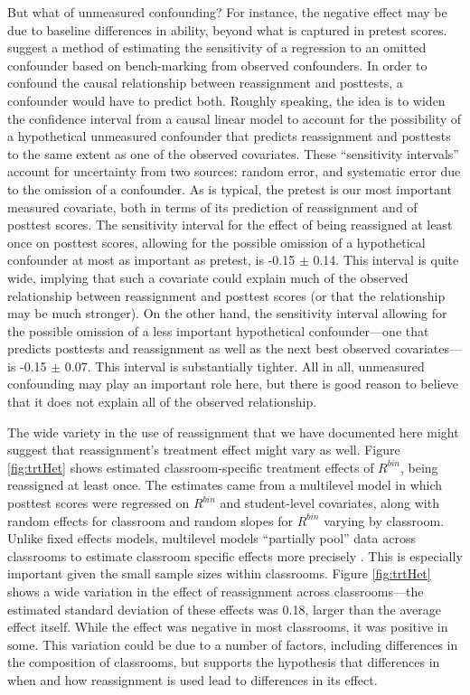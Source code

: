 \documentclass[12pt]{article}\usepackage[]{graphicx}\usepackage[]{color}
\begin{document}
But what of unmeasured confounding?
For instance, the negative effect may be due to baseline differences
in ability, beyond what is captured in pretest scores.
\citet{hhh} suggest a method of estimating the sensitivity of a regression to an omitted confounder based on bench-marking from observed confounders.
In order to confound the causal relationship between reassignment and posttests, a confounder would have to predict both.
Roughly speaking, the idea is to widen the confidence interval from a causal linear model to account for the possibility of a hypothetical unmeasured confounder that predicts reassignment and posttests to the same extent as one of the observed covariates.
These ``sensitivity intervals'' account for uncertainty from two sources: random error, and systematic error due to the omission of a confounder.
As is typical, the pretest is our most important measured covariate, both in terms of its prediction of reassignment and of posttest scores.
The sensitivity interval for the effect of being reassigned at least
once on posttest scores, allowing for the possible omission of a
hypothetical confounder at most as important as pretest, is
-0.15 $\pm$
0.14.
This interval is quite wide, implying that such a covariate could
explain much of the observed relationship between reassignment and
posttest scores (or that the relationship may be much stronger).
On the other hand, the sensitivity interval allowing for the possible
omission of a less important hypothetical confounder---one that
predicts posttests and reassignment as well as the next best observed
covariates---is
-0.15 $\pm$
0.07.
This interval is substantially tighter.
All in all, unmeasured confounding may play an important role here,
but there is good reason to believe that it does not explain all of
the observed relationship.

The wide variety in the use of reassignment that we have documented
here might suggest that reassignment's treatment effect might vary as
well.
Figure \ref{fig:trtHet} shows estimated classroom-specific treatment
effects of $R^{bin}$, being reassigned at least once.
The estimates came from a multilevel model in which posttest scores
were regressed on $R^{bin}$ and student-level covariates, along with
random effects for classroom and random slopes for $R^{bin}$ varying
by classroom.
Unlike fixed effects models, multilevel models ``partially pool'' data
across classrooms to estimate classroom specific effects more precisely \citep{gelmanHill}.
This is especially important given the small sample sizes within
classrooms.
Figure \ref{fig:trtHet} shows a wide variation in the effect of
reassignment across classrooms---the estimated standard deviation of
these effects was
0.18,
larger than the average effect itself.
While the effect was negative in most classrooms, it was positive in some.
This variation could be due to a number of factors, including
differences in the composition of classrooms, but supports the
hypothesis that differences in when and how reassignment is used
lead to differences in its effect.
\end{document}
